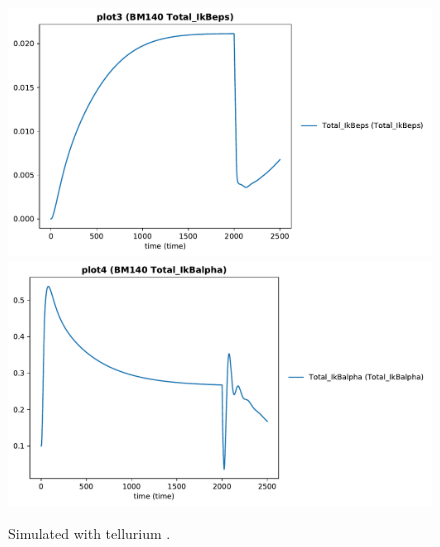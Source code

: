 \begin{figure}[ht]
\begin{minipage}{0.47\textwidth}
		\includegraphics[width=1.0\textwidth]{examples/ikappab/results/tellurium/plot3}
		\includegraphics[width=1.0\textwidth]{examples/ikappab/results/tellurium/plot4}
        \caption{Simulated with tellurium \citep{tellurium}.}
    \end{minipage}
    \label{fig:ikappab}
\end{figure}


